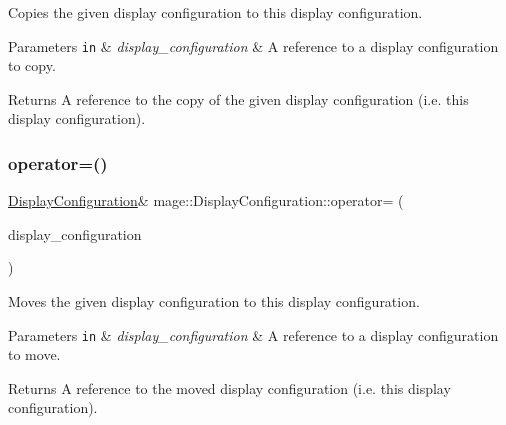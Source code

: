 Copies the given display configuration to this display configuration.


\begin{DoxyParams}[1]{Parameters}
\mbox{\tt in}  & {\em display\+\_\+configuration} & A reference to a display configuration to copy. \\
\hline
\end{DoxyParams}
\begin{DoxyReturn}{Returns}
A reference to the copy of the given display configuration (i.\+e. this display configuration). 
\end{DoxyReturn}
\hypertarget{structmage_1_1_display_configuration_a56c175220b8f597afd7d5d6275b5d0de}{}\label{structmage_1_1_display_configuration_a56c175220b8f597afd7d5d6275b5d0de} 
\subsubsection{\texorpdfstring{operator=()}{operator=()}\hspace{0.1cm}{\footnotesize\ttfamily [2/2]}}
{\footnotesize\ttfamily \hyperlink{structmage_1_1_display_configuration}{Display\+Configuration}\& mage\+::\+Display\+Configuration\+::operator= (\begin{DoxyParamCaption}\item[{\hyperlink{structmage_1_1_display_configuration}{Display\+Configuration} \&\&}]{display\+\_\+configuration }\end{DoxyParamCaption})\hspace{0.3cm}{\ttfamily [default]}}

Moves the given display configuration to this display configuration.


\begin{DoxyParams}[1]{Parameters}
\mbox{\tt in}  & {\em display\+\_\+configuration} & A reference to a display configuration to move. \\
\hline
\end{DoxyParams}
\begin{DoxyReturn}{Returns}
A reference to the moved display configuration (i.\+e. this display configuration). 
\end{DoxyReturn}
\hypertarget{structmage_1_1_display_configuration_a23401fc0c20d52d44480c32fc6020e85}{}\label{structmage_1_1_display_configuration_a23401fc0c20d52d44480c32fc6020e85} 
